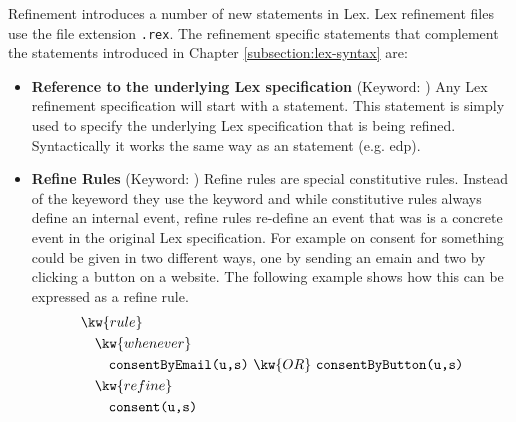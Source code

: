 Refinement introduces a number of new statements in Lex.
Lex refinement files use the file extension \texttt{.rex}.
The refinement specific statements that complement the statements
introduced in Chapter \ref{subsection:lex-syntax} are:
\begin{itemize}
    \item \textbf{Reference to the underlying Lex specification}
        (Keyword: )
        Any Lex refinement specification will start with a 
        statement.
        This statement is simply used to specify the underlying Lex
        specification that is being refined.
        Syntactically it works the same way as an  statement
        (e.g.  edp).
    \item \textbf{Refine Rules}
        (Keyword: )
        Refine rules are special constitutive rules.
        Instead of the keyeword  they use the keyword
         and while constitutive rules always
        define an internal event, refine rules
        re-define an event that was is a concrete event
        in the original Lex specification.
        For example on consent for something
        could be given in two different ways,
        one by sending an emain and two by clicking
        a button on a website.
        The following example shows how this can be expressed as a
        refine rule.
        \begin{align*}
            &\kw{rule} \\
            &\quad \kw{whenever} \\
            &\qquad \texttt{consentByEmail(u,s)}~\kw{OR}~\texttt{consentByButton(u,s)} \\            
            &\quad \kw{refine} \\
            &\qquad \texttt{consent(u,s)}
        \end{align*}


\end{itemize}
